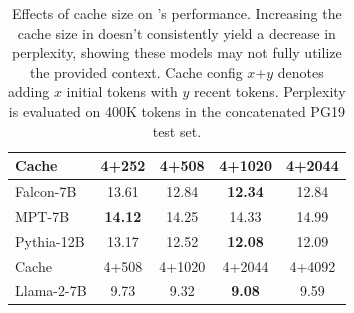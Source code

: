 \begin{table}
    \centering
    \setlength{\tabcolsep}{2pt}
\small
    \caption{\small Effects of cache size on \method's performance.
    Increasing the cache size in \method doesn't consistently yield a decrease in perplexity, showing these models may not fully utilize the provided context.
    Cache config $x$+$y$ denotes adding $x$ initial tokens with $y$ recent tokens.
    Perplexity is evaluated on 400K tokens in the concatenated PG19 test set.
    }
    \vspace{-0.5em}
    \label{tab:cache_size}
    \begin{tabular}{lcccc}
\toprule
Cache     & 4+252   & 4+508   & 4+1020  & 4+2044  \\
\midrule
Falcon-7B  & 13.61 & 12.84 & \textbf{12.34} & 12.84 \\
MPT-7B     & \textbf{14.12} & 14.25 & 14.33 & 14.99 \\
Pythia-12B     &13.17 & 12.52 & \textbf{12.08} & 12.09 \\
\midrule
\midrule
Cache     & 4+508   & 4+1020  & 4+2044  & 4+4092  \\
\midrule
Llama-2-7B & 9.73  & 9.32  & \textbf{9.08}  & 9.59   \\
\bottomrule
\end{tabular}
\end{table}
